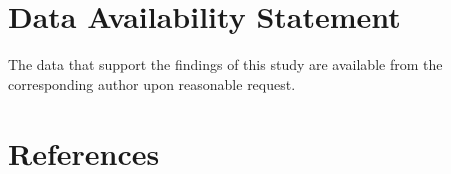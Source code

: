 \documentclass[%
 aip,jap,
 amsmath,amssymb,
 reprint,%
]{revtex4-1}
\begin{document}
\section*{Data Availability Statement}

The data that support the findings of this study are available from the corresponding author upon reasonable request.

\section*{References}


\end{document}
